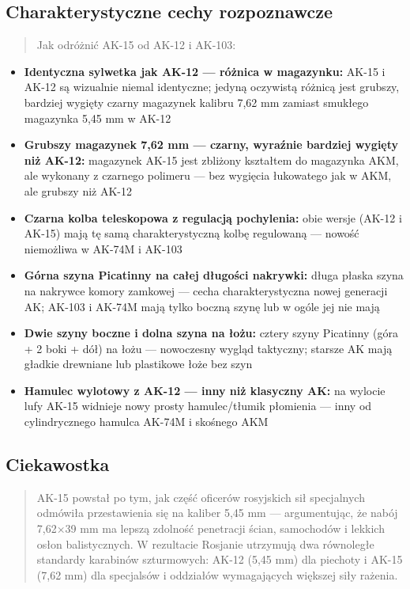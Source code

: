 \documentclass[12pt,oneside]{book}
\providecommand{\tightlist}{%
  \setlength{\itemsep}{0pt}\setlength{\parskip}{0pt}}
\begin{document}
\subsection{Charakterystyczne cechy
rozpoznawcze}\label{charakterystyczne-cechy-rozpoznawcze-64}

\begin{quote}
Jak odróżnić AK-15 od AK-12 i AK-103:
\end{quote}

\begin{itemize}
\tightlist
\item
  \textbf{Identyczna sylwetka jak AK-12 --- różnica w magazynku:} AK-15
  i AK-12 są wizualnie niemal identyczne; jedyną oczywistą różnicą jest
  grubszy, bardziej wygięty czarny magazynek kalibru 7,62 mm zamiast
  smukłego magazynka 5,45 mm w AK-12
\item
  \textbf{Grubszy magazynek 7,62 mm --- czarny, wyraźnie bardziej
  wygięty niż AK-12:} magazynek AK-15 jest zbliżony kształtem do
  magazynka AKM, ale wykonany z czarnego polimeru --- bez wygięcia
  łukowatego jak w AKM, ale grubszy niż AK-12
\item
  \textbf{Czarna kolba teleskopowa z regulacją pochylenia:} obie wersje
  (AK-12 i AK-15) mają tę samą charakterystyczną kolbę regulowaną ---
  nowość niemożliwa w AK-74M i AK-103
\item
  \textbf{Górna szyna Picatinny na całej długości nakrywki:} długa
  płaska szyna na nakrywce komory zamkowej --- cecha charakterystyczna
  nowej generacji AK; AK-103 i AK-74M mają tylko boczną szynę lub w
  ogóle jej nie mają
\item
  \textbf{Dwie szyny boczne i dolna szyna na łożu:} cztery szyny
  Picatinny (góra + 2 boki + dół) na łożu --- nowoczesny wygląd
  taktyczny; starsze AK mają gładkie drewniane lub plastikowe łoże bez
  szyn
\item
  \textbf{Hamulec wylotowy z AK-12 --- inny niż klasyczny AK:} na
  wylocie lufy AK-15 widnieje nowy prosty hamulec/tłumik płomienia ---
  inny od cylindrycznego hamulca AK-74M i skośnego AKM
\end{itemize}

\subsection{Ciekawostka}\label{ciekawostka-64}

\begin{quote}
AK-15 powstał po tym, jak część oficerów rosyjskich sił specjalnych
odmówiła przestawienia się na kaliber 5,45 mm --- argumentując, że nabój
7,62×39 mm ma lepszą zdolność penetracji ścian, samochodów i lekkich
osłon balistycznych. W rezultacie Rosjanie utrzymują dwa równoległe
standardy karabinów szturmowych: AK-12 (5,45 mm) dla piechoty i AK-15
(7,62 mm) dla specjalsów i oddziałów wymagających większej siły rażenia.
\end{quote}
\end{document}
